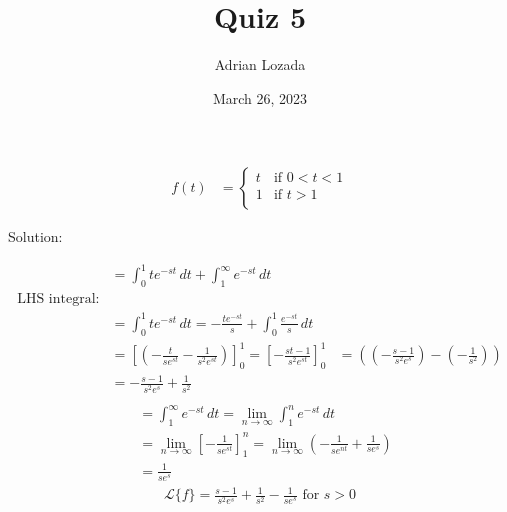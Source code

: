 \documentclass{article}
\title{Quiz 5}
\author{Adrian Lozada}
\date{March 26, 2023}
\begin{document}
    \maketitle
    \newpage
    \begin{align*}
        f(t) &= 
        \begin{cases}
            t & \text{if } 0 < t < 1 \\
            1 & \text{if } t > 1 \\
        \end{cases}
    \end{align*}
    \begin{flushleft}
        Solution: \\
    \end{flushleft}
    \begin{align*}
        &= \int_0^1 te^{-st} \, dt + \int_1^\infty e^{-st} \, dt \\
        \text{LHS integral:} \\
        &= \int_0^1 te^{-st} \, dt = -\frac{te^{-st}}{s} + \int_{0}^{1} \frac{e^{-st}}{s} \, dt \\
        &= \left[\left( -\frac{t}{se^{st}} - \frac{1}{s^{2}e^{st}}\right)\right]_0^1 = \left[ -\frac{st - 1}{s^{2}e^{st}}\right]_0^1
        &= \left( \left(-\frac{s - 1}{s^2e^{s}}\right) - \left(-\frac{1}{s^{2}}\right)\right) \\
        &= -\frac{s-1}{s^{2}e^{s}} + \frac{1}{s^{2}} \\
    \end{align*}
    \begin{align*}
        &= \int_1^\infty e^{-st} \, dt = \lim_{n \to \infty} \int_{1}^{n} e^{-st} \, dt \\
        &= \lim_{n \to \infty} \left[ -\frac{1}{se^{st}}\right]_1^n = \lim_{n \to \infty}\left(-\frac{1}{se^{nt}} + \frac{1}{se^{s}}\right) \\
        &= \frac{1}{se^{s}}
    \end{align*}
    \begin{align*}
       \mathcal{L}\{f\} = \frac{s - 1}{s^{2}e^{s}} + \frac{1}{s^{2}} - \frac{1}{se^{s}} \text{ for } s > 0\\
    \end{align*}    
\end{document}
